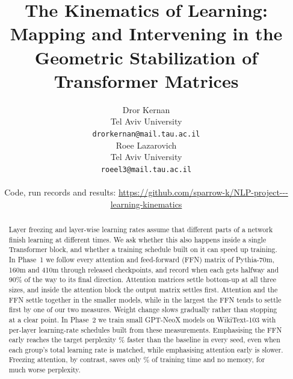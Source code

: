 \documentclass[11pt]{article}
\title{The Kinematics of Learning: Mapping and Intervening in the\\
       Geometric Stabilization of Transformer Matrices}
\author{Dror Kernan \\
  Tel Aviv University \\
  \texttt{drorkernan@mail.tau.ac.il} \\\And
  Roee Lazarovich \\
  Tel Aviv University \\
  \texttt{roeel3@mail.tau.ac.il} \\
  \\[-4pt]
  \AND
  \normalfont\small Code, run records and results:
  \url{https://github.com/sparrow-k/NLP-project---learning-kinematics}}
\begin{document}
\maketitle


\begin{abstract}
Layer freezing and layer-wise learning rates assume that different parts of a
network finish learning at different times. We ask whether this also happens
inside a single Transformer block, and whether a training schedule built on it
can speed up training. In Phase~1 we follow every attention and feed-forward
(FFN) matrix of Pythia-70m, 160m and 410m through \NCheckpoints{} released
checkpoints, and record when each gets halfway and 90\% of the way to its
final direction. Attention matrices settle bottom-up at all three sizes, and
inside the attention block the output matrix settles first. Attention and the
FFN settle together in the smaller models, while in the largest the FFN tends
to settle first by one of our two measures. Weight change slows gradually
rather than stopping at a clear point. In Phase~2 we train \PhaseTwoRuns{}
small GPT-NeoX models on WikiText-103 with per-layer learning-rate schedules
built from these measurements. Emphasising the FFN early reaches the target
perplexity \ASLStepsRelAbs\% faster than the baseline in every seed, even when
each group's total learning rate is matched, while emphasising attention early
is slower. Freezing attention, by contrast, saves only \FrzWallRelAbs\% of
training time and no memory, for much worse perplexity.
\end{abstract}
\end{document}
